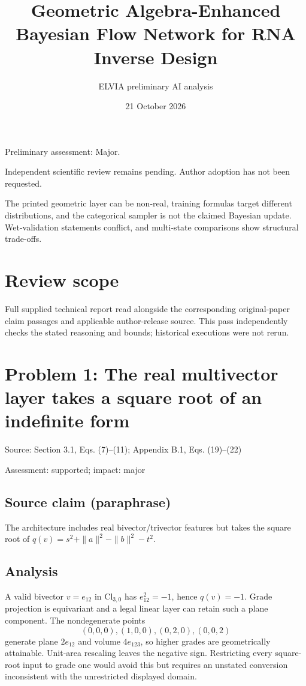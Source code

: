 \documentclass[11pt]{article}
\begin{document}
\title{Geometric Algebra-Enhanced Bayesian Flow Network for RNA Inverse Design}

\author{ELVIA preliminary AI analysis}\date{21 October 2026}\maketitle

Preliminary assessment: Major.\par

Independent scientific review remains pending. Author adoption has not been requested.

The printed geometric layer can be non-real, training formulas target different distributions, and the categorical sampler is not the claimed Bayesian update. Wet-validation statements conflict, and multi-state comparisons show structural trade-offs.

\section*{Review scope}

Full supplied technical report read alongside the corresponding original-paper claim passages and applicable author-release source. This pass independently checks the stated reasoning and bounds; historical executions were not rerun.

\section*{Problem 1: The real multivector layer takes a square root of an indefinite form}

Source: Section 3.1, Eqs. (7)–(11); Appendix B.1, Eqs. (19)–(22)

Assessment: supported; impact: major

\subsection*{Source claim (paraphrase)}

The architecture includes real bivector/trivector features but takes the square root of \(q(v)=s^2+\|a\|^2-\|b\|^2-t^2\).

\subsection*{Analysis}

A valid bivector \(v=e_{12}\) in \(\mathrm{Cl}_{3,0}\) has \(e_{12}^2=-1\), hence \(q(v)=-1\). Grade projection is equivariant and a legal linear layer can retain such a plane component. The nondegenerate points \[(0,0,0),(1,0,0),(0,2,0),(0,0,2)\] generate plane \(2e_{12}\) and volume \(4e_{123}\), so higher grades are geometrically attainable. Unit-area rescaling leaves the negative sign. Restricting every square-root input to grade one would avoid this but requires an unstated conversion inconsistent with the unrestricted displayed domain.
\end{document}
